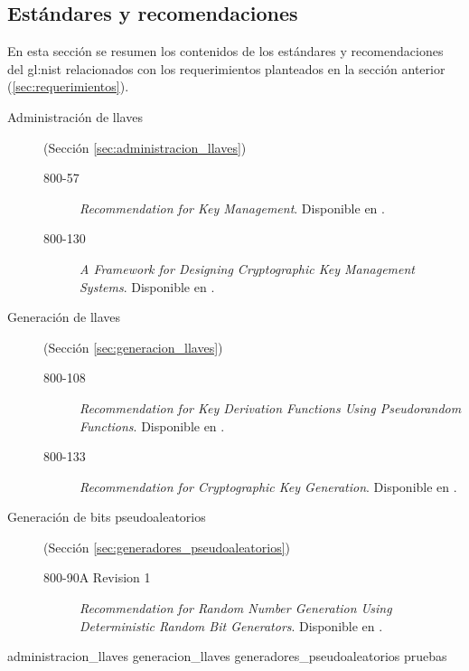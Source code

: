 %
%

\subsection{Estándares y recomendaciones}
\label{sec:estandares}

En esta sección se resumen los contenidos de los estándares y recomendaciones
del \gls{gl:nist} relacionados con los requerimientos planteados en la
sección anterior (\ref{sec:requerimientos}).

\begin{description}

  \item[Administración de llaves] (Sección \ref{sec:administracion_llaves})
    \begin{description}
      \item[800-57] \textit{Recommendation for Key Management}. Disponible en
        \cite{nist_llaves}.
      \item[800-130] \textit{A Framework for Designing Cryptographic Key
        Management Systems}. Disponible en \cite{nist_disenio_llaves}.
    \end{description}

  \item[Generación de llaves] (Sección \ref{sec:generacion_llaves})
    \begin{description}
      \item[800-108] \textit{Recommendation for Key Derivation Functions Using
        Pseudorandom Functions}. Disponible en \cite{nist_derivacion_llaves}.
      \item[800-133] \textit{Recommendation for Cryptographic Key Generation}.
        Disponible en \cite{nist_creacion_llaves}.
    \end{description}

  \item[Generación de bits pseudoaleatorios] (Sección
    \ref{sec:generadores_pseudoaleatorios})
    \begin{description}
      \item[800-90A Revision 1] \textit{Recommendation for Random Number Generation Using
        Deterministic Random Bit Generators}. Disponible en
        \cite{nist_aleatorios}.
    \end{description}
\end{description}

{administracion_llaves}
{generacion_llaves}
{generadores_pseudoaleatorios}
{pruebas}
